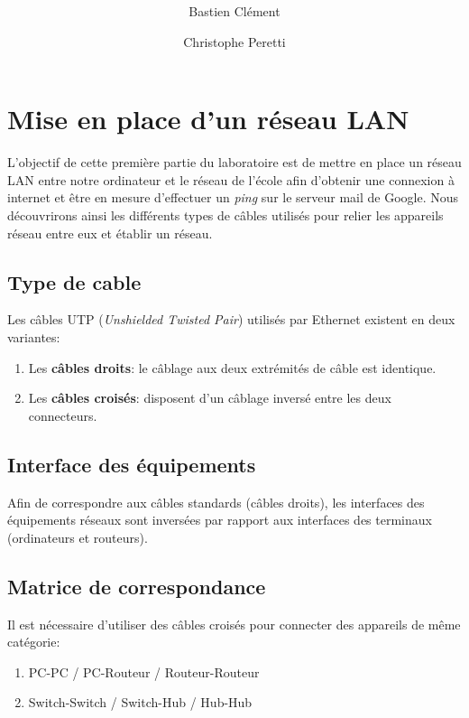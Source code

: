 \documentclass[11pt,a4paper]{article}
\author{Bastien Clément \and Christophe Peretti}
\title{{\normalsize \doccourse} \\ \doctitle }
\begin{document}
\maketitle
\vspace{1em}

\section{Mise en place d'un réseau LAN}

L'objectif de cette première partie du laboratoire est de mettre en place un réseau LAN entre notre ordinateur et le réseau de l'école afin d'obtenir une connexion à internet et être en mesure d'effectuer un \textit{ping} sur le serveur mail de Google. Nous découvrirons ainsi les différents types de câbles utilisés pour relier les appareils réseau entre eux et établir un réseau.

\subsection{Type de cable}

Les câbles UTP (\textit{Unshielded Twisted Pair}) utilisés par Ethernet existent en deux variantes:

\begin{enumerate}
	\item Les \textbf{câbles droits}: le câblage aux deux extrémités de câble est identique.
	\item Les \textbf{câbles croisés}: disposent d'un câblage inversé entre les deux connecteurs.
\end{enumerate}

\subsection{Interface des équipements}

Afin de correspondre aux câbles standards (câbles droits), les interfaces des équipements réseaux sont inversées par rapport aux interfaces des terminaux (ordinateurs et routeurs).

\subsection{Matrice de correspondance}

Il est nécessaire d'utiliser des câbles croisés pour connecter des appareils de même catégorie:

\begin{enumerate}
	\item PC-PC / PC-Routeur / Routeur-Routeur
	\item Switch-Switch / Switch-Hub / Hub-Hub
\end{enumerate}
\end{document}
